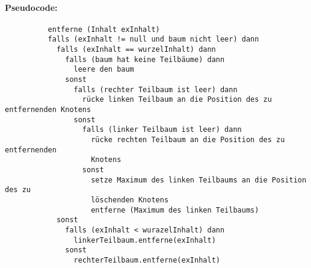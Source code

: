\documentclass[a4paper, 12pt]{report}
\newenvironment{gblock}[1]{
    \tcolorbox[beamer,
        noparskip,
        colback=blue!25!,
        colbacklower=blue!75!blue,
        title=#1]}
{\endtcolorbox}
\begin{document}
	\vspace{1cm}
	\begin{gblock}{Löschen aus einem Binären Suchbaum}
		\paragraph{Pseudocode:} 
		\begin{verbatim}
		  entferne (Inhalt exInhalt)
		  falls (exInhalt != null und baum nicht leer) dann
		    falls (exInhalt == wurzelInhalt) dann
		      falls (baum hat keine Teilbäume) dann
		        leere den baum
		      sonst
		        falls (rechter Teilbaum ist leer) dann
		          rücke linken Teilbaum an die Position des zu entfernenden Knotens
		        sonst
		          falls (linker Teilbaum ist leer) dann
		            rücke rechten Teilbaum an die Position des zu entfernenden
		            Knotens
		          sonst
		            setze Maximum des linken Teilbaums an die Position des zu
		            löschenden Knotens
		            entferne (Maximum des linken Teilbaums)
		    sonst
		      falls (exInhalt < wurazelInhalt) dann
		        linkerTeilbaum.entferne(exInhalt)
		      sonst
		        rechterTeilbaum.entferne(exInhalt)
		\end{verbatim}
	\end{gblock}
\end{document}

